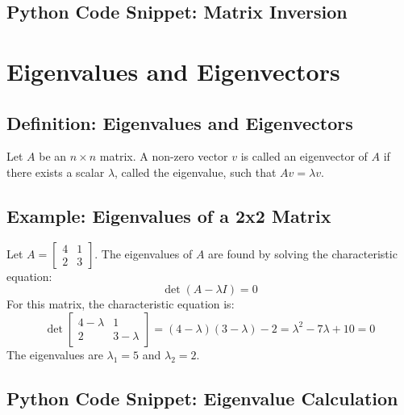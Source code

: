 \subsection{Python Code Snippet: Matrix Inversion}
\begin{codesnippet}
\end{codesnippet}

\section{Eigenvalues and Eigenvectors}

\subsection{Definition: Eigenvalues and Eigenvectors}
\begin{defi}
Let $A$ be an $n \times n$ matrix. A non-zero vector $v$ is called an eigenvector of $A$ if there exists a scalar $\lambda$, called the eigenvalue, such that $Av = \lambda v$.
\end{defi}

\subsection{Example: Eigenvalues of a 2x2 Matrix}
\begin{example}
Let $A = \begin{bmatrix} 4 & 1 \\ 2 & 3 \end{bmatrix}$. The eigenvalues of $A$ are found by solving the characteristic equation:
\[
\det(A - \lambda I) = 0
\]
For this matrix, the characteristic equation is:
\[
\det\begin{bmatrix} 4 - \lambda & 1 \\ 2 & 3 - \lambda \end{bmatrix} = (4 - \lambda)(3 - \lambda) - 2 = \lambda^2 - 7\lambda + 10 = 0
\]
The eigenvalues are $\lambda_1 = 5$ and $\lambda_2 = 2$.
\end{example}

\subsection{Python Code Snippet: Eigenvalue Calculation}
\begin{codesnippet}
\end{codesnippet}

